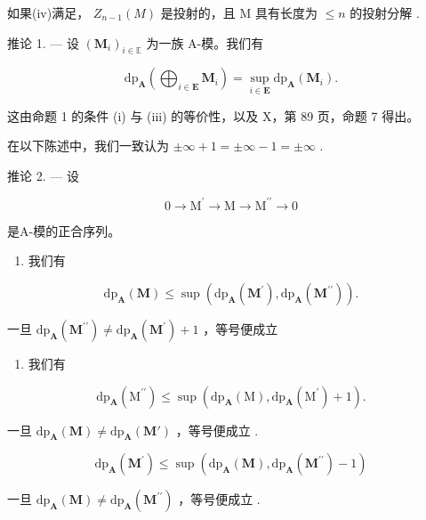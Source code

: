 如果(iv)满足， \(Z_{n-1}(M)\) 是投射的，且 M 具有长度为 \(\leqslant n\) 的投射分解 .

推论 1. --- 设 \((\mathbf{M}_i)_{i\in \mathbb{E}}\) 为一族 A-模。我们有

\[
\mathrm{dp} _ {\mathbf {A}} \left(\bigoplus_ {i \in \mathbf {E}} \mathbf {M} _ {i}\right) = \sup _ {i \in \mathbf {E}} \mathrm{dp} _ {\mathbf {A}} (\mathbf {M} _ {i}).
\]

这由命题 1 的条件 (i) 与 (iii) 的等价性，以及 X，第 89 页，命题 7 得出。

在以下陈述中，我们一致认为 \(\pm\infty + 1 = \pm\infty - 1 = \pm\infty\) .

推论 2. --- 设

\[
0 \rightarrow \mathrm{M} ^ {\prime} \rightarrow \mathrm{M} \rightarrow \mathrm{M} ^ {\prime \prime} \rightarrow 0
\]

是A-模的正合序列。

\begin{enumerate}
\def\labelenumi{\alph{enumi})}
\tightlist
\item
  我们有
\end{enumerate}

\[
\mathrm{dp} _ {\mathbf {A}} (\mathbf {M}) \leqslant \sup \left(\mathrm{dp} _ {\mathbf {A}} (\mathbf {M} ^ {\prime}), \mathrm{dp} _ {\mathbf {A}} (\mathbf {M} ^ {\prime \prime})\right).
\]

一旦 \(\mathrm{dp}_{\mathbf{A}}(\mathbf{M}^{\prime \prime})\neq \mathrm{dp}_{\mathbf{A}}(\mathbf{M}^{\prime}) + 1\) ，等号便成立

\begin{enumerate}
\def\labelenumi{\alph{enumi})}
\setcounter{enumi}{1}
\tightlist
\item
  我们有
\end{enumerate}

\[
\mathrm{dp} _ {\mathbf {A}} \left(\mathrm{M} ^ {\prime \prime}\right) \leqslant \sup \left(\mathrm{dp} _ {\mathbf {A}} (\mathrm{M}), \mathrm{dp} _ {\mathbf {A}} \left(\mathrm{M} ^ {\prime}\right) + 1\right).
\]

一旦 \(\mathrm{dp}_{\mathbf{A}}(\mathbf{M}) \neq \mathrm{dp}_{\mathbf{A}}(\mathbf{M}')\) ，等号便成立 .

\[
\mathrm{dp} _ {\mathbf {A}} \left(\mathbf {M} ^ {\prime}\right) \leqslant \sup \left(\mathrm{dp} _ {\mathbf {A}} (\mathbf {M}), \mathrm{dp} _ {\mathbf {A}} \left(\mathbf {M} ^ {\prime \prime}\right) - 1\right)
\]

一旦 \(\mathrm{dp}_{\mathbf{A}}(\mathbf{M}) \neq \mathrm{dp}_{\mathbf{A}}(\mathbf{M}^{\prime \prime})\) ，等号便成立 .


